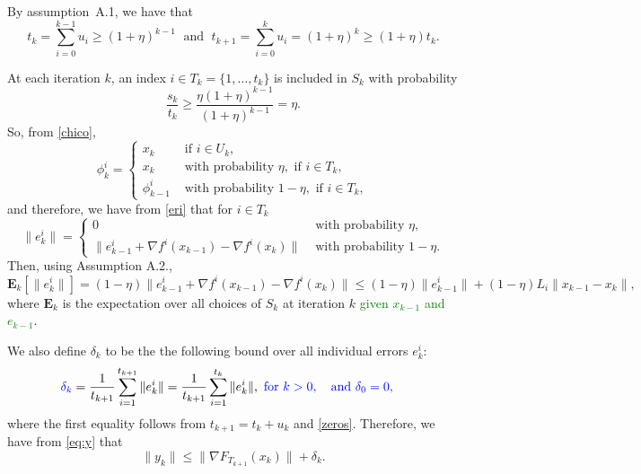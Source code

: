 \documentclass[11pt]{article}
\newcommand{\E}{\mathbf{E}}
\begin{document}
By assumption~A.1, we have that 
\begin{equation}
	t_{k} = \sum_{i=0}^{k-1} u_i \geq (1+\eta)^{k-1} \; \mbox{ and } \; t_{k+1} = \sum_{i=0}^{k} u_i = (1+\eta)^{k} \geq (1+\eta) t_k.
	\label{kkasdf}
\end{equation}

At each iteration $k$, an index $i\in T_k =  \{1,\ldots,t_k\}$ is included in $S_k$ with probability 
\begin{equation}
    \frac{s_k}{t_k}  \geq \frac{\eta (1+\eta)^{k-1}}{(1+\eta)^{k-1}} = \eta . 
 \end{equation}
 So, from \eqref{chico}, 
\[
\phi_{k}^i=
 \begin{cases}
   x_k &\mbox{ if } i\in U_k, \\
   x_k  &\mbox{ with probability }\eta , \mbox{ if } i \in T_k,\\
   \phi_{k-1}^i & \mbox{ with probability }1-\eta , \mbox{ if } i \in T_k,
 \end{cases}
\]
and therefore, we have from \eqref{eri} that for $i\in T_k$
\[
\|e_k^i\| =
 \begin{cases}
  0  & \mbox{ with probability }\eta,\\
  \|e_{k-1}^i + \nabla f^i(x_{k-1}) - \nabla f^i(x_k) \| & \mbox{ with probability }1-\eta .
 \end{cases}
\]
 Then, using Assumption A.2., 
 \begin{equation}\label{eq:expec}
 \E_k[\|e_k^i\|] = (1-\eta)\|e_{k-1}^i + \nabla f^i(x_{k-1}) - \nabla f^i(x_k) \| \leq (1-\eta)\|e_{k-1}^i\| + (1-\eta)L_i \|x_{k-1} - x_k\|,
\end{equation}
where $\E_k$ is the expectation over all choices of $S_k$ at iteration $k$ \textcolor{green}{given $x_{k-1}$ and $e_{k-1}$}. 

We also {\color{blue} define $\delta_k$} to be the the following bound over  all individual errors $e_k^i$:
\begin{align}
 {\color{blue} \delta_k } &= \frac{1}{t_{k+1}} \sum_{i=1}^{t_{k+1}} \|e_k^i\| = \frac{1}{t_{k+1}}\sum_{i=1}^{t_k}\|e_k^i\| , 
      {\color{blue}  \ \mbox{for} \  k>0,  \quad\mbox{and} \ \delta_0=0, }      \label{eq:defe}
\end{align}
where the first equality follows from $t_{k+1}= t_k +u_k$ and  
\eqref{zeros}. Therefore, we have from \eqref{eq:y} that
\begin{equation} \label{yfe}
    \| y_k \| \leq \| \nabla F_{T_{k+1}}(x_k) \| + \delta_k.
\end{equation}  
\end{document}

